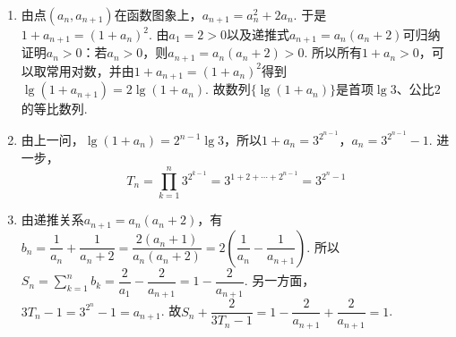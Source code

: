 \begin{solution}
\begin{enumerate}
\item 由点\((a_n,a_{n+1})\)在函数图象上，\(a_{n+1}=a_n^2+2a_n\). 于是\(1+a_{n+1}=(1+a_n)^2\).
由\(a_1=2>0\)以及递推式\(a_{n+1}=a_n(a_n+2)\)可归纳证明\(a_n>0\)：若\(a_n>0\)，则\(a_{n+1}=a_n(a_n+2)>0\). 所以所有\(1+a_n>0\)，可以取常用对数，并由\(1+a_{n+1}=(1+a_n)^2\)得到\(\lg(1+a_{n+1})=2\lg(1+a_n)\).
故数列\(\{\lg(1+a_n)\}\)是首项\(\lg3\)、公比\(2\)的等比数列.

\item 由上一问，\(\lg(1+a_n)=2^{n-1}\lg3\)，所以\(1+a_n=3^{2^{n-1}}\)，\(a_n=3^{2^{n-1}}-1\).
进一步，
\[
T_n=\prod_{k=1}^{n}3^{2^{k-1}}
=3^{1+2+\cdots+2^{n-1}}
=3^{2^n-1}
\]

\item 由递推关系\(a_{n+1}=a_n(a_n+2)\)，有\(b_n=\dfrac1{a_n}+\dfrac1{a_n+2}=\dfrac{2(a_n+1)}{a_n(a_n+2)}=2\left(\dfrac1{a_n}-\dfrac1{a_{n+1}}\right)\). 所以\(S_n=\sum_{k=1}^{n}b_k=\dfrac2{a_1}-\dfrac2{a_{n+1}}=1-\dfrac2{a_{n+1}}\). 另一方面，\(3T_n-1=3^{2^n}-1=a_{n+1}\). 故\(S_n+\dfrac2{3T_n-1}=1-\dfrac2{a_{n+1}}+\dfrac2{a_{n+1}}=1\).
\end{enumerate}
\end{solution}
